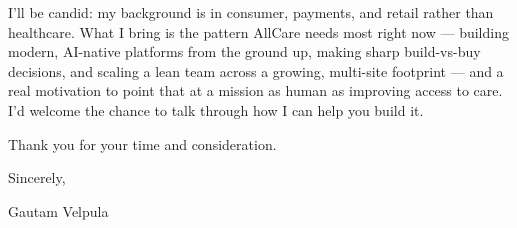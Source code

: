 \documentclass[11pt]{article}
\begin{document}
I'll be candid: my background is in consumer, payments, and retail rather than healthcare. What I bring is the pattern AllCare needs most right now --- building modern, AI-native platforms from the ground up, making sharp build-vs-buy decisions, and scaling a lean team across a growing, multi-site footprint --- and a real motivation to point that at a mission as human as improving access to care. I'd welcome the chance to talk through how I can help you build it.

Thank you for your time and consideration.

\vspace{6pt}

Sincerely,

\vspace{6pt}

Gautam Velpula
\end{document}
